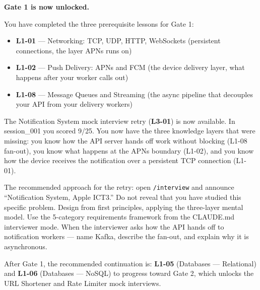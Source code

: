 \documentclass[11pt,a4paper]{article}
\begin{document}
\begin{insightbox}
\textbf{Gate 1 is now unlocked.}

You have completed the three prerequisite lessons for Gate 1:
\begin{itemize}[leftmargin=1.5em, itemsep=2pt]
  \item \textbf{L1-01} --- Networking: TCP, UDP, HTTP, WebSockets (persistent connections, the layer APNs runs on)
  \item \textbf{L1-02} --- Push Delivery: APNs and FCM (the device delivery layer, what happens after your worker calls out)
  \item \textbf{L1-08} --- Message Queues and Streaming (the async pipeline that decouples your API from your delivery workers)
\end{itemize}

The Notification System mock interview retry (\textbf{L3-01}) is now available. In session\_001 you scored 9/25. You now have the three knowledge layers that were missing: you know how the API server hands off work without blocking (L1-08 fan-out), you know what happens at the APNs boundary (L1-02), and you know how the device receives the notification over a persistent TCP connection (L1-01).

The recommended approach for the retry: open \texttt{/interview} and announce ``Notification System, Apple ICT3.'' Do not reveal that you have studied this specific problem. Design from first principles, applying the three-layer mental model. Use the 5-category requirements framework from the CLAUDE.md interviewer mode. When the interviewer asks how the API hands off to notification workers --- name Kafka, describe the fan-out, and explain why it is asynchronous.

After Gate 1, the recommended continuation is: \textbf{L1-05} (Databases --- Relational) and \textbf{L1-06} (Databases --- NoSQL) to progress toward Gate 2, which unlocks the URL Shortener and Rate Limiter mock interviews.
\end{insightbox}
\end{document}
